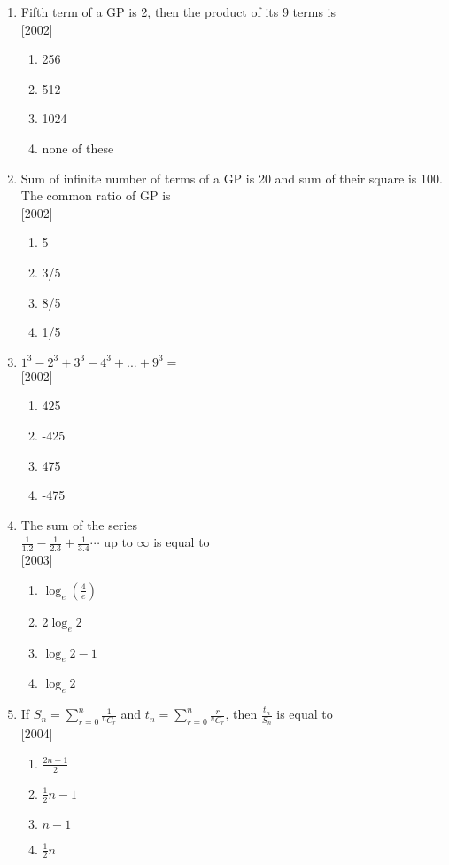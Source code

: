 \documentclass[journal,12pt,twocolumn]{IEEEtran}
\theoremstyle{remark}
\begin{document}
\begin{enumerate}[label={\arabic*.}]
\item {Fifth term of a GP is 2, then the product of its 9 terms is}\\ \hfill{[2002]}
\begin{enumerate}[label={(\alph*)}]
\item  {256}
\item  {512}
\item  {1024}
\item  {none of these}
\end{enumerate}

\item {Sum of infinite number of terms of a GP is 20 and sum of their square is 100. The common ratio of GP is}\\ \hfill{[2002]}
\begin{enumerate}[label={(\alph*)}]
\item  {5}
\item  {3/5}
\item  {8/5}
\item  {1/5}
\end{enumerate} 

\item {$1^{3}-2^{3}+3^{3}-4^{3}+...
+9^{3}=$}\\ \hfill{[2002]}
\begin{enumerate}[label={(\alph*)}]
\item  {425}
\item  {-425}
\item  {475}
\item  {-475}
\end{enumerate}

\item {The sum of the series \\ $\frac{1}{1.2}-\frac{1}{2.3}+\frac{1}{3.4}\cdots \text{ up to } \infty$ is equal to}\\ \hfill{[2003]}
\begin{enumerate}[label={(\alph*)}]
\item  {$\log_e (\frac{4}{e})$}
\item  {2$\log_e 2$}
\item  {$\log_e 2-1$}
\item  {$\log_e 2$}
\end{enumerate}

\item {If $S_n = \sum\limits_{r=0}^{n} \frac{1}{{}^{n}C_{r}}$ and $t_n = \sum\limits_{r=0}^{n} \frac{r}{{}^{n}C_{r}}$, then $\frac{t_n}{S_n}$ is equal to}\\ \hfill{[2004]}
\begin{enumerate}[label={(\alph*)}]
\item  {$\frac{2n-1}{2}$}
\item  {$\frac{1}{2}n-1$}
\item  {$n-1$}
\item  {$\frac{1}{2}n$}
\end{enumerate}


\end{enumerate}
\end{document}
